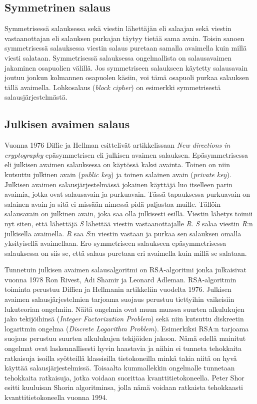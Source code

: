 \subsection{Symmetrinen salaus}
 Symmetrisessä salauksessa sekä viestin lähettäjän eli salaajan sekä viestin vastaanottajan eli salauksen purkajan täytyy tietää sama avain. Toisin sanoen symmetrisessä salauksessa viestin salaus puretaan samalla avaimella kuin millä viesti salataan.  Symmetrisessä salauksessa ongelmallista on salausavaimen jakaminen osapuolien välillä. Jos symmetriseen salaukseen käytetty salausavain joutuu jonkun kolmannen osapuolen käsiin, voi tämä osapuoli purkaa salauksen tällä avaimella. Lohkosalaus (\emph{block cipher}) on esimerkki symmetrisestä salausjärjestelmästä.
 
 \subsection{Julkisen avaimen salaus}
 Vuonna 1976 Diffie ja Hellman esittelivät artikkelissaan \emph{New directions in cryptography} epäsymmetrisen eli julkisen avaimen salauksen. Epäsymmetrisessa eli julkisen avaimen salauksessa on käytössä kaksi avainta. Toinen on niin kutsuttu julkinen avain (\emph{public key}) ja toinen salainen avain (\emph{private key}). Julkisen avaimen salausjärjestelmässä jokainen käyttäjä luo itselleen parin avaimia, jotka ovat salausavain ja purkuavain. Tässä tapauksessa purkuavain on salainen avain ja sitä ei missään nimessä pidä paljastaa muille. Tällöin salausavain on julkinen avain, joka saa olla julkisesti esillä. Viestin lähetys toimii nyt siten, että lähettäjä \emph{S} lähettää viestin vastaanottajalle \emph{R}. \emph{S} salaa viestin \emph{R}:n julkisella avaimella. \emph{R} saa \emph{S}:n viestin vastaan ja purkaa sen salauksen omalla yksityisellä avaimellaan. Ero symmetriseen salaukseen epäsymmetrisessa salauksessa on siis se, että salaus puretaan eri avaimella kuin millä se salataan.
 
 Tunnetuin julkisen avaimen salausalgoritmi on RSA-algoritmi jonka julkaisivat vuonna 1978 Ron Rivest, Adi Shamir ja Leonard Adleman. RSA-algoritmin toiminta perustuu Diffien ja Hellmanin artikkeliin vuodelta 1976. Julkisen avaimen salausjärjestelmien tarjoama suojaus perustuu tiettyihin vaikeisiin lukuteorian ongelmiin. Näitä ongelmia ovat muun muassa suurten alkulukujen jako tekijöihinsä (\emph{Integer Factorization Problem}) sekä niin kutsuttu diskreetin logaritmin ongelma (\emph{Discrete Logarithm Problem}). Esimerkiksi RSA:n tarjoama suojaus perustuu suurten alkulukujen tekijöiden jakoon. Nämä edellä mainitut ongelmat ovat laskennallisesti hyvin haastavia ja niihin ei tunneta tehokkaita ratkaisuja isoilla syötteillä klassisilla tietokoneilla minkä takia niitä on hyvä käyttää salausjärjestelmissä. Toisaalta kummallekkin ongelmalle tunnetaan tehokkaita ratkaisuja, jotka voidaan suorittaa kvanttitietokoneella. Peter Shor esitti kuuluisan Shorin algoritminsa, jolla nämä voidaan ratkaista tehokkaasti kvanttitietokoneella vuonna 1994.
 
